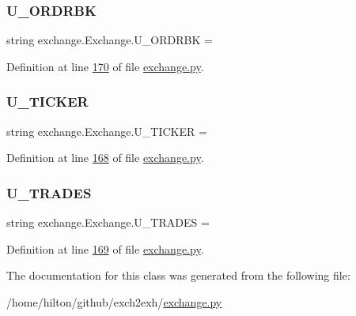 \subsubsection{\texorpdfstring{U\+\_\+\+O\+R\+D\+R\+BK}{U\_ORDRBK}}
{\footnotesize\ttfamily string exchange.\+Exchange.\+U\+\_\+\+O\+R\+D\+R\+BK = \textquotesingle{}\textquotesingle{}\hspace{0.3cm}{\ttfamily [static]}}



Definition at line \hyperlink{exchange_8py_source_l00170}{170} of file \hyperlink{exchange_8py_source}{exchange.\+py}.

\mbox{\label{classexchange_1_1_exchange_ab16df02480d727c533b02b5b7afa053b}} 
\subsubsection{\texorpdfstring{U\+\_\+\+T\+I\+C\+K\+ER}{U\_TICKER}}
{\footnotesize\ttfamily string exchange.\+Exchange.\+U\+\_\+\+T\+I\+C\+K\+ER = \textquotesingle{}\textquotesingle{}\hspace{0.3cm}{\ttfamily [static]}}



Definition at line \hyperlink{exchange_8py_source_l00168}{168} of file \hyperlink{exchange_8py_source}{exchange.\+py}.

\mbox{\label{classexchange_1_1_exchange_aafa0e023de170f51cbf9d48e1154587a}} 
\subsubsection{\texorpdfstring{U\+\_\+\+T\+R\+A\+D\+ES}{U\_TRADES}}
{\footnotesize\ttfamily string exchange.\+Exchange.\+U\+\_\+\+T\+R\+A\+D\+ES = \textquotesingle{}\textquotesingle{}\hspace{0.3cm}{\ttfamily [static]}}



Definition at line \hyperlink{exchange_8py_source_l00169}{169} of file \hyperlink{exchange_8py_source}{exchange.\+py}.



The documentation for this class was generated from the following file\+:\begin{DoxyCompactItemize}
\item 
/home/hilton/github/exch2exh/\hyperlink{exchange_8py}{exchange.\+py}\end{DoxyCompactItemize}
